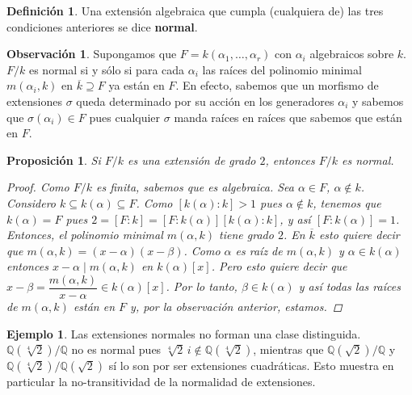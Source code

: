 \documentclass[12pt]{book}
\newtheorem{prop}[teo]{Proposición}
\theoremstyle{definition}
\newtheorem{obs}[teo]{Observación}
\newtheorem{defn}[teo]{Definición}
\newtheorem{ex}[teo]{Ejemplo}
\newcommand{\QQ}{\mathbb{Q}}
\begin{document}
\begin{defn}
Una extensión algebraica que cumpla (cualquiera de) las tres condiciones anteriores se dice \textbf{normal}.
\end{defn}

\begin{obs}
Supongamos que $F=k(\alpha_1,\ldots , \alpha_r)$ con $\alpha_i$ algebraicos sobre $k$. $F/k$ es normal si y sólo si para cada $\alpha_i$ las raíces del polinomio minimal $m(\alpha_i,k)$ en $\overline{k}\supseteq F$ ya están en $F$. En efecto, sabemos que un morfismo de extensiones $\sigma$ queda determinado por su acción en los generadores $\alpha_i$ y sabemos que $\sigma(\alpha_i)\in F$ pues cualquier $\sigma$ manda raíces en raíces que sabemos que están en $F$.
\end{obs}

\begin{prop}
Si $F/k$ es una extensión de grado $2$, entonces $F/k$ es normal.
\begin{proof}
Como $F/k$ es finita, sabemos que es algebraica. Sea $\alpha\in F$, $\alpha\notin k$. Considero $k\subseteq k(\alpha)\subseteq F$. Como $[k(\alpha):k]>1$ pues $\alpha\notin k$, tenemos que $k(\alpha)=F$ pues $2=[F:k] = [F:k(\alpha)][k(\alpha):k]$, y así $[F:k(\alpha)]=1$. Entonces, el polinomio minimal $m(\alpha,k)$ tiene grado $2$. En $\overline{k}$ esto quiere decir que $m(\alpha,k) = (x-\alpha)(x-\beta)$. Como $\alpha$ es raíz de $m(\alpha,k)$ y $\alpha\in k(\alpha)$ entonces $x-\alpha \mid m(\alpha,k)$ en $k(\alpha)[x]$. Pero esto quiere decir que $x-\beta = \dfrac{m(\alpha,k)}{x-\alpha}\in k(\alpha)[x]$. Por lo tanto, $\beta \in k(\alpha)$ y así todas las raíces de $m(\alpha,k)$ están en $F$ y, por la observación anterior, estamos.
\end{proof}
\end{prop}

\begin{ex}
Las extensiones normales no forman una clase distinguida. $\QQ(\sqrt[4]{2})/\QQ$ no es normal pues $\sqrt[4]{2}\, i\notin\QQ(\sqrt[4]{2})$, mientras que $\QQ(\sqrt{2})/\QQ$ y $\QQ(\sqrt[4]{2})/\QQ(\sqrt{2})$ sí lo son por ser extensiones cuadráticas. Esto muestra en particular la no-transitividad de la normalidad de extensiones.
\end{ex}
\end{document}
